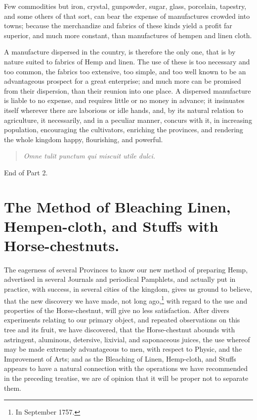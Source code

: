 \documentclass[a4paper, 11pt, oneside, polutonikogreek, english]{article}
\begin{document}
Few commodities but iron, crystal, gunpowder, sugar, glass, porcelain, tapestry, and some others of that sort, can bear the expense of manufactures crowded into towns; because the merchandize and fabrics of these kinds yield a profit far superior, and much more constant, than manufactures of hempen and linen cloth.

A manufacture dispersed in the country, is therefore the only one, that is by nature suited to fabrics of Hemp and linen. The use of these is too necessary and too common, the fabrics too extensive, too simple, and too well known to be an advantageous prospect for a great enterprise; and much more can be promised from their dispersion, than their reunion into one place. A dispersed manufacture is liable to no expense, and requires little or no money in advance; it insinuates itself wherever there are laborious or idle hands, and, by its natural relation to agriculture, it necessarily, and in a peculiar manner, concurs with it, in increasing population, encouraging the cultivators, enriching the provinces, and rendering the whole kingdom happy, flourishing, and powerful.
\begin{quotation}
\emph{Omne tulit punctum qui miscuit utile dulci.}
\end{quotation}
\begin{center}
End of Part 2.
\end{center}
\clearpage
\section{The Method of Bleaching Linen, Hempen-cloth, and Stuffs with Horse-chestnuts.}
\paragraph{}
The eagerness of several Provinces to know our new method of preparing Hemp, advertised in several Journals and periodical Pamphlets, and actually put in practice, with success, in several cities of the kingdom, gives us ground to believe, that the new discovery we have made, not long ago,\footnote{In September 1757.} with regard to the use and properties of the Horse-chestnut, will give no less satisfaction. After divers experiments relating to our primary object, and repeated observations on this tree and its fruit, we have discovered, that the Horse-chestnut abounds with astringent, aluminous, detersive, lixivial, and saponaceous juices, the use whereof may be made extremely advantageous to men, with respect to Physic, and the Improvement of Arts; and as the Bleaching of Linen, Hemp-cloth, and Stuffs appears to have a natural connection with the operations we have recommended in the preceding treatise, we are of opinion that it will be proper not to separate them.
\end{document}
